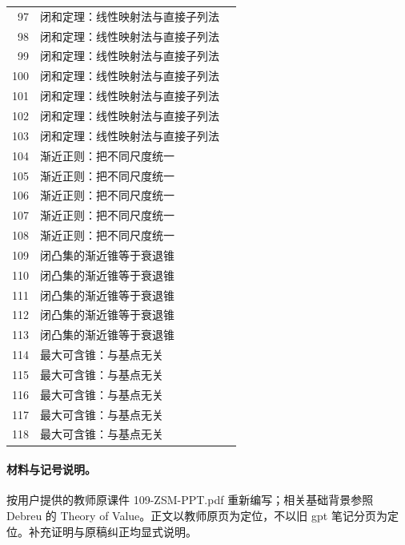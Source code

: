 \begin{longtable}{r p{.66\linewidth} r}
97 & 闭和定理：线性映射法与直接子列法 & \pageref{g:109:97}\\

98 & 闭和定理：线性映射法与直接子列法 & \pageref{g:109:97}\\

99 & 闭和定理：线性映射法与直接子列法 & \pageref{g:109:97}\\

100 & 闭和定理：线性映射法与直接子列法 & \pageref{g:109:97}\\

101 & 闭和定理：线性映射法与直接子列法 & \pageref{g:109:97}\\

102 & 闭和定理：线性映射法与直接子列法 & \pageref{g:109:97}\\

103 & 闭和定理：线性映射法与直接子列法 & \pageref{g:109:97}\\

104 & 渐近正则：把不同尺度统一 & \pageref{g:109:104}\\

105 & 渐近正则：把不同尺度统一 & \pageref{g:109:104}\\

106 & 渐近正则：把不同尺度统一 & \pageref{g:109:104}\\

107 & 渐近正则：把不同尺度统一 & \pageref{g:109:104}\\

108 & 渐近正则：把不同尺度统一 & \pageref{g:109:104}\\

109 & 闭凸集的渐近锥等于衰退锥 & \pageref{g:109:109}\\

110 & 闭凸集的渐近锥等于衰退锥 & \pageref{g:109:109}\\

111 & 闭凸集的渐近锥等于衰退锥 & \pageref{g:109:109}\\

112 & 闭凸集的渐近锥等于衰退锥 & \pageref{g:109:109}\\

113 & 闭凸集的渐近锥等于衰退锥 & \pageref{g:109:109}\\

114 & 最大可含锥：与基点无关 & \pageref{g:109:114}\\

115 & 最大可含锥：与基点无关 & \pageref{g:109:114}\\

116 & 最大可含锥：与基点无关 & \pageref{g:109:114}\\

117 & 最大可含锥：与基点无关 & \pageref{g:109:114}\\

118 & 最大可含锥：与基点无关 & \pageref{g:109:114}\\

\bottomrule\end{longtable}

\paragraph{材料与记号说明。}按用户提供的教师原课件 109-ZSM-PPT.pdf 重新编写；相关基础背景参照 Debreu 的 Theory of Value。正文以教师原页为定位，不以旧 gpt 笔记分页为定位。补充证明与原稿纠正均显式说明。
